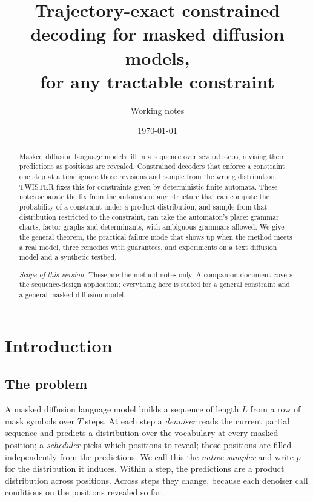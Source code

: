 \documentclass[11pt]{article}
\title{Trajectory-exact constrained decoding for masked diffusion models,\\for any tractable constraint}
\author{Working notes}
\date{\today}
\theoremstyle{definition}
\begin{document}
\maketitle

\begin{abstract}
Masked diffusion language models fill in a sequence over several steps, revising their predictions as positions
are revealed. Constrained decoders that enforce a constraint one step at a time ignore those revisions and sample
from the wrong distribution. TWISTER fixes this for constraints given by deterministic finite automata. These
notes separate the fix from the automaton: any structure that can compute the probability of a constraint under a
product distribution, and sample from that distribution restricted to the constraint, can take the automaton's
place: grammar charts, factor graphs and determinants, with ambiguous grammars
allowed. We give the
general theorem, the practical failure mode that shows up when the method meets a real model, three remedies with
guarantees, and experiments on a text diffusion model and a synthetic testbed.

\emph{Scope of this version.} These are the method notes only. A companion document covers the sequence-design
application; everything here is stated for a general constraint and a general masked diffusion model.
\end{abstract}

\tableofcontents

\section{Introduction}\label{sec:intro}

\subsection{The problem}
A masked diffusion language model \cite{sahoo2024} builds a sequence of length $L$ from a row of mask symbols over
$T$ steps. At each step a \emph{denoiser} reads the current partial sequence and predicts a distribution over the
vocabulary at every masked position; a \emph{scheduler} picks which positions to reveal; those positions are
filled independently from the predictions. We call this the \emph{native sampler} and write $p$ for the
distribution it induces. Within a step, the predictions are a product distribution across positions. Across
steps they change, because each denoiser call conditions on the positions revealed so far.
\end{document}

